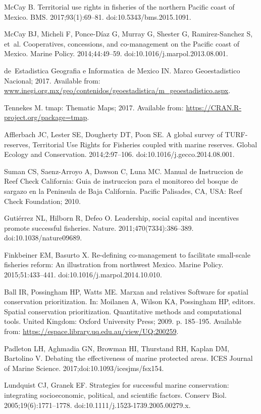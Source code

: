 \documentclass[10pt,letterpaper]{article}
\begin{document}
\begin{thebibliography}{10}
McCay B.
\newblock Territorial use rights in fisheries of the northern Pacific coast of
  Mexico.
\newblock BMS. 2017;93(1):69--81.
\newblock doi:{10.5343/bms.2015.1091}.

McCay BJ, Micheli F, Ponce-Díaz G, Murray G, Shester G, Ramirez-Sanchez S,
  et~al.
\newblock Cooperatives, concessions, and co-management on the Pacific coast of
  Mexico.
\newblock Marine Policy. 2014;44:49--59.
\newblock doi:{10.1016/j.marpol.2013.08.001}.

de~Estadistica Geografia e Informatica~de Mexico IN. Marco Geoestadistico
  Nacional; 2017.
\newblock Available from:
  \url{www.inegi.org.mx/geo/contenidos/geoestadistica/m_geoestadistico.aspx}.

Tennekes M. tmap: Thematic Maps; 2017.
\newblock Available from: \url{https://CRAN.R-project.org/package=tmap}.

Afflerbach JC, Lester SE, Dougherty DT, Poon SE.
\newblock A global survey of TURF-reserves, Territorial Use Rights for
  Fisheries coupled with marine reserves.
\newblock Global Ecology and Conservation. 2014;2:97--106.
\newblock doi:{10.1016/j.gecco.2014.08.001}.

Suman CS, Saenz-Arroyo A, Dawson C, Luna MC.
\newblock Manual de Instruccion de Reef Check California: Guia de instruccion
  para el monitoreo del bosque de sargazo en la Peninsula de Baja California.
\newblock Pacific Palisades, CA, USA: Reef Check Foundation; 2010.

Gutiérrez NL, Hilborn R, Defeo O.
\newblock Leadership, social capital and incentives promote successful
  fisheries.
\newblock Nature. 2011;470(7334):386--389.
\newblock doi:{10.1038/nature09689}.

Finkbeiner EM, Basurto X.
\newblock Re-defining co-management to facilitate small-scale fisheries reform:
  An illustration from northwest Mexico.
\newblock Marine Policy. 2015;51:433--441.
\newblock doi:{10.1016/j.marpol.2014.10.010}.

Ball IR, Possingham HP, Watts ME.
\newblock Marxan and relatives Software for spatial conservation
  prioritization.
\newblock In: Moilanen A, Wilson KA, Possingham HP, editors. Spatial
  conservation prioritization. Quantitative methods and computational tools.
  United Kingdom: Oxford University Press; 2009. p. 185--195.
\newblock Available from:
  \url{https://espace.library.uq.edu.au/view/UQ:200259}.

Padleton LH, Aghmadia GN, Browman HI, Thurstand RH, Kaplan DM, Bartolino V.
\newblock Debating the effectiveness of marine protected areas.
\newblock ICES Journal of Marine Science. 2017;doi:{10.1093/icesjms/fsx154}.

Lundquist CJ, Granek EF.
\newblock Strategies for successful marine conservation: integrating
  socioeconomic, political, and scientific factors.
\newblock Conserv Biol. 2005;19(6):1771--1778.
\newblock doi:{10.1111/j.1523-1739.2005.00279.x}.

\end{thebibliography}
\end{document}
